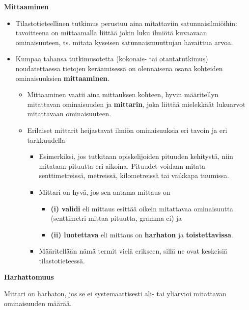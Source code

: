 \documentclass[
]{book}
\providecommand{\tightlist}{%
  \setlength{\itemsep}{0pt}\setlength{\parskip}{0pt}}
\begin{document}
\textbf{Mittaaminen}

\begin{itemize}
\item
  Tilastotieteellinen tutkimus perustuu aina mitattaviin satunnaisilmiöihin: tavoitteena on mittaamalla liittää jokin luku ilmiötä kuvaavaan ominaisuuteen, ts. mitata kyseisen satunnaismuuttujan havaittua arvoa.
\item
  Kumpaa tahansa tutkimusotetta (kokonais- tai otantatutkimus) noudatettaessa tietojen keräämisessä on olennaisena osana kohteiden ominaisuuksien \textbf{mittaaminen}.

  \begin{itemize}
  \tightlist
  \item
    Mittaaminen vaatii aina mittauksen kohteen, hyvin määritellyn mitattavan ominaisuuden ja \textbf{mittarin}, joka liittää mielekkäät lukuarvot mitattavaan ominaisuuteen.
  \item
    Erilaiset mittarit heijastavat ilmiön ominaisuuksia eri tavoin ja eri tarkkuudella

    \begin{itemize}
    \tightlist
    \item
      Esimerkiksi, jos tutkitaan opiskelijoiden pituuden kehitystä, niin mitataan pituutta eri aikoina. Pituudet voidaan mitata senttimetreissä, metreissä, kilometreissä tai vaikkapa tuumissa.
    \item
      Mittari on hyvä, jos sen antama mittaus on

      \begin{itemize}
      \tightlist
      \item
        \textbf{(i) validi} eli mittaus esittää oikein mitattavaa ominaisuutta (senttimetri mittaa pituutta, gramma ei) ja
      \item
        \textbf{(ii) luotettava} eli mittaus on \textbf{harhaton} ja \textbf{toistettavissa}.
      \end{itemize}
    \item
      Määritellään nämä termit vielä erikseen, sillä ne ovat keskeisiä tilastotieteessä.
    \end{itemize}
  \end{itemize}
\end{itemize}

\begin{defblock}{}
\textbf{Harhattomuus}

Mittari on harhaton, jos se ei systemaattisesti ali- tai yliarvioi mitattavan ominaisuuden määrää.

\end{defblock}
\end{document}
